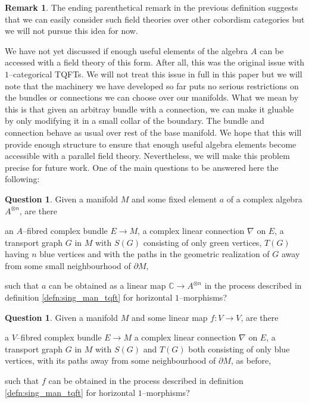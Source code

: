 \documentclass{amsart}
\newcommand{\C}{\mathbb{C}}
\newcommand{\tensor}{\otimes}
\renewcommand{\to}[1][]{\stackrel{#1}{\longrightarrow}}
\newcommand{\li}[1][]{\ifthenelse{\equal{#1}{}}{\item}{\item \label{#1}}}
\newenvironment{enmrt}{
  \enumerate[(i)]
  \setlength{\itemsep}{0pt}
}{
  \endenumerate
}
\numberwithin{thm}{section}
\theoremstyle{definition}
\newtheorem{rmk}[thm]{Remark}
\newtheorem{qstn}[thm]{Question}
\begin{document}
\begin{rmk}
The ending parenthetical remark in the previous definition suggests that we can
easily consider such field theories over other cobordism categories but we will
not pursue this idea for now.
\end{rmk}

We have not yet discussed if enough useful elements of the algebra $A$ can be
accessed with a field theory of this form. After all, this was the original
issue with $1$--categorical TQFTs. We will not treat this issue in full in this
paper but we will note that the machinery we have developed so far puts no
serious restrictions on the bundles or connections we can choose over our
manifolds. What we mean by this is that given an arbitray bundle with a
connection, we can make it gluable by only modifying it in a small collar of the
boundary. The bundle and connection behave as usual over rest of the base
manifold. We hope that this will provide enough structure to ensure that enough
useful algebra elements become accessible with a parallel field theory.
Nevertheless, we will make this problem precise for future work.
One of the main questions to be answered here the following:

\begin{qstn}\label{qstn:elem_from_pt}
Given a manifold $M$ and some fixed element $a$ of a complex algebra
$A^{\tensor n}$, are there
\begin{enmrt}
\li an $A$--fibred complex bundle $E \to M$,
\li a complex linear connection $\nabla$ on $E$,
\li a transport graph $G$ in $M$ with $S(G)$ consisting of only green vertices,
$T(G)$ having $n$ blue vertices and with the paths in the geometric realization
of $G$ away from some small neighbourhood of $\partial M$,
\end{enmrt}
such that $a$ can be obtained as a linear map $\C \to A^{\tensor n}$ in
the process described in definition \ref{defn:sing_man_tqft} for horizontal
$1$--morphisms?
\end{qstn}

\begin{qstn}\label{qstn:map_from_pt}
Given a manifold $M$ and some linear map $f : V \to V$, are there
\begin{enmrt}
\li a $V$--fibred complex bundle $E \to M$
\li a complex linear connection $\nabla$ on $E$,
\li a transport graph $G$ in $M$ with $S(G)$ and $T(G)$ both consisting of only
blue vertices, with its paths away from some neighbourhood of $\partial M$, as
before,
\end{enmrt}
such that $f$ can be obtained in the process described in definition
\ref{defn:sing_man_tqft} for horizontal $1$--morphisms?
\end{qstn}
\end{document}
